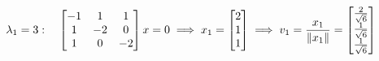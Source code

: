 \documentclass[preview]{standalone}
\begin{document}
\begin{align*}
\special{dvisvgm:raw <g id='unique000'>}\lambda_1 = 3: \special{dvisvgm:raw </g>}\special{dvisvgm:raw <g id='unique001'>}\quad \begin{bmatrix} -1 & 1 & 1 \\ 1 & -2 & 0 \\ 1 & 0 & -2 \end{bmatrix} x = 0 \special{dvisvgm:raw </g>}\special{dvisvgm:raw <g id='unique002'>}\implies x_1 = \begin{bmatrix} 2 \\ 1 \\ 1 \end{bmatrix} \special{dvisvgm:raw </g>}\special{dvisvgm:raw <g id='unique003'>}\implies v_1 = \frac{x_1}{\|x_1\|} = \begin{bmatrix} \frac{2}{\sqrt{6}} \\ \frac{1}{\sqrt{6}} \\ \frac{1}{\sqrt{6}} \end{bmatrix}\special{dvisvgm:raw </g>}
\end{align*}
\end{document}
